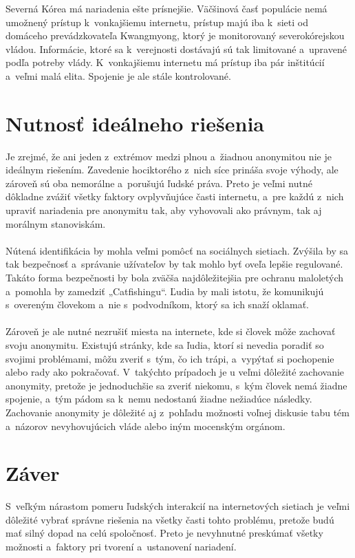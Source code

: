 \documentclass{artikel1}
\begin{document}
Severná Kórea  má nariadenia ešte prísnejšie. Väčšinová časť populácie nemá umožnený prístup k~vonkajšiemu internetu, prístup majú iba k~sieti od domáceho prevádzkovateľa Kwangmyong, ktorý je  monitorovaný severokórejskou vládou. Informácie, ktoré sa k~verejnosti dostávajú sú tak limitované a~upravené podľa potreby vlády.  K~vonkajšiemu internetu  má prístup iba pár inštitúcií a~veľmi malá elita. Spojenie je ale stále kontrolované.~\cite{wiki-nk-i, wiki-nk-c}

\section{Nutnosť ideálneho riešenia}

Je zrejmé, že ani jeden z~extrémov  medzi plnou a~žiadnou anonymitou nie je ideálnym riešením. Zavedenie hociktorého z~nich síce prináša svoje výhody, ale zároveň sú oba nemorálne a~porušujú ľudské práva. Preto je veľmi nutné dôkladne zvážiť všetky faktory ovplyvňujúce časti internetu, a~pre každú z~nich upraviť nariadenia pre anonymitu tak, aby vyhovovali ako právnym, tak aj morálnym stanoviskám.\\\\
Nútená identifikácia by mohla veľmi pomôcť na sociálnych sietiach. Zvýšila by sa tak bezpečnosť a~správanie užívateľov by tak mohlo byť oveľa lepšie regulované. Takáto forma  bezpečnosti by bola zväčša najdôležitejšia pre ochranu maloletých a~pomohla by zamedziť „Catfishingu“. Ľudia by mali istotu, že komunikujú s~overeným človekom  a~nie s~podvodníkom,  ktorý sa ich snaží oklamať.\\\\
Zároveň je ale nutné nezrušiť miesta na internete, kde si človek môže zachovať svoju anonymitu. Existujú stránky, kde sa ľudia, ktorí si nevedia poradiť so svojimi problémami, môžu zveriť s~tým, čo ich trápi, a~vypýtať si pochopenie alebo rady ako pokračovať. V~takýchto prípadoch je u veľmi dôležité zachovanie anonymity, pretože je jednoduchšie sa zveriť niekomu, s~kým človek nemá žiadne spojenie, a~tým pádom sa k~nemu nedostanú žiadne nežiadúce následky. Zachovanie anonymity je dôležité aj z~pohľadu možnosti voľnej diskusie tabu tém a~názorov nevyhovujúcich vláde alebo iným mocenským orgánom.

\section{Záver}
S~veľkým nárastom pomeru ľudských interakcií na internetových  sietiach je veľmi dôležité vybrať správne riešenia na všetky časti tohto problému, pretože budú mať silný dopad na celú spoločnosť. Preto je nevyhnutné preskúmať všetky možnosti a~faktory pri tvorení a~ustanovení nariadení.\\\\
\end{document}
